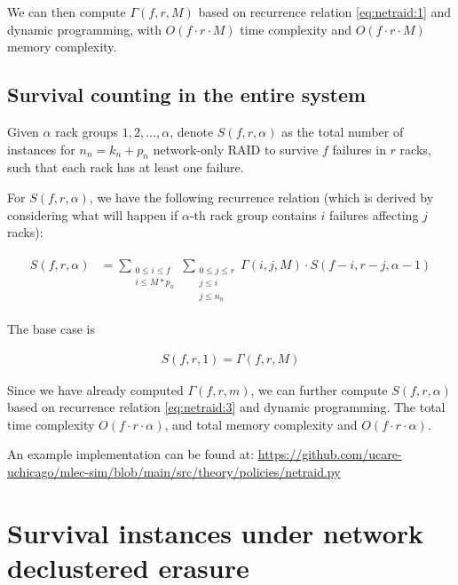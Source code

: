 \documentclass{article}
\begin{document}
We can then compute $\Gamma(f,r,M)$ based on recurrence relation \ref{eq:netraid:1} and dynamic programming, with $O(f \cdot r \cdot M)$ time complexity and $O(f \cdot r \cdot M)$ memory complexity.


\subsection{Survival counting in the entire system}

Given $\alpha$ rack groups $1,2,...,\alpha$, denote $S(f,r, \alpha)$ as the total number of instances for $n_n=k_n+p_n$ network-only RAID to survive $f$ failures in $r$ racks, such that each rack has at least one failure.

For $S(f,r,\alpha)$, we have the following recurrence relation (which is derived by considering what will happen if $\alpha$-th rack group contains $i$ failures affecting $j$ racks):

\begin{eqnarray}
\begin{aligned}
  S(f,r,\alpha)
  &= \sum_{\substack{0 \leq i \leq f \\ i \leq M*p_n}}
  \sum_{\substack{0 \leq j \leq r \\ j \leq i \\ j \leq n_n}}
  \Gamma(i,j,M) \cdot S(f-i, r-j, \alpha-1)
\end{aligned}
\label{eq:netraid:3}
\end{eqnarray}

The base case is 

\begin{eqnarray}
  S(f,r,1) =  \Gamma(f,r,M)
\label{eq:netraid:4}
\end{eqnarray}

Since we have already computed $\Gamma(f,r,m)$, we can further compute $S(f,r,\alpha)$ based on recurrence relation \ref{eq:netraid:3} and dynamic programming. The total time complexity $O(f \cdot r \cdot \alpha)$, and total memory complexity and $O(f \cdot r \cdot \alpha)$.

An example implementation can be found at: \url{https://github.com/ucare-uchicago/mlec-sim/blob/main/src/theory/policies/netraid.py}






\section{Survival instances under network declustered erasure}
\end{document}
